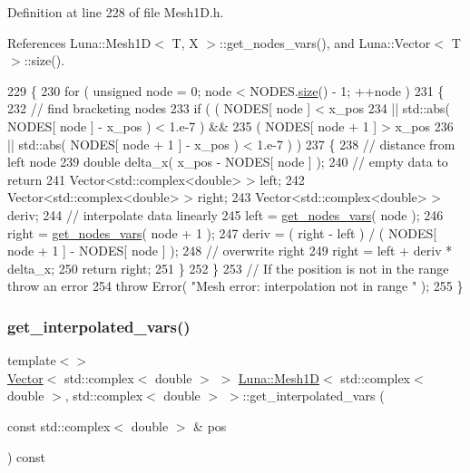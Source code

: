 Definition at line 228 of file Mesh1\+D.\+h.



References Luna\+::\+Mesh1\+D$<$ T, X $>$\+::get\+\_\+nodes\+\_\+vars(), and Luna\+::\+Vector$<$ T $>$\+::size().


\begin{DoxyCode}
229   \{
230     \textcolor{keywordflow}{for} ( \textcolor{keywordtype}{unsigned} node = 0; node < NODES.\hyperlink{classLuna_1_1Vector_ac9b6ed7a0df401728f27c193fbc8f4d8}{size}() - 1; ++node )
231     \{
232       \textcolor{comment}{// find bracketing nodes}
233       \textcolor{keywordflow}{if} ( ( NODES[ node ] < x\_pos
234         || std::abs( NODES[ node ] - x\_pos ) < 1.e-7 ) &&
235            ( NODES[ node + 1 ] > x\_pos
236         || std::abs( NODES[ node + 1 ] - x\_pos ) < 1.e-7 ) )
237       \{
238         \textcolor{comment}{// distance from left node}
239         \textcolor{keywordtype}{double} delta\_x( x\_pos - NODES[ node ] );
240         \textcolor{comment}{// empty data to return}
241         Vector<std::complex<double> > left;
242         Vector<std::complex<double> > right;
243         Vector<std::complex<double> > deriv;
244         \textcolor{comment}{// interpolate data linearly}
245         left = \hyperlink{classLuna_1_1Mesh1D_ac26360c5d246da376ebdcaa9fab05e81}{get\_nodes\_vars}( node );
246         right = \hyperlink{classLuna_1_1Mesh1D_ac26360c5d246da376ebdcaa9fab05e81}{get\_nodes\_vars}( node + 1 );
247         deriv = ( right - left ) / ( NODES[ node + 1 ] - NODES[ node ] );
248         \textcolor{comment}{// overwrite right}
249         right = left + deriv * delta\_x;
250         \textcolor{keywordflow}{return} right;
251       \}
252     \}
253     \textcolor{comment}{// If the position is not in the range throw an error}
254     \textcolor{keywordflow}{throw} Error( \textcolor{stringliteral}{"Mesh error: interpolation not in range "} );
255   \}
\end{DoxyCode}
\mbox{\label{classLuna_1_1Mesh1D_a58f5f0a80fc4af9e82d5753f5b29604a}} 
\subsubsection{\texorpdfstring{get\+\_\+interpolated\+\_\+vars()}{get\_interpolated\_vars()}\hspace{0.1cm}{\footnotesize\ttfamily [4/4]}}
{\footnotesize\ttfamily template$<$$>$ \\
\hyperlink{classLuna_1_1Vector}{Vector}$<$ std\+::complex$<$ double $>$ $>$ \hyperlink{classLuna_1_1Mesh1D}{Luna\+::\+Mesh1D}$<$ std\+::complex$<$ double $>$, std\+::complex$<$ double $>$ $>$\+::get\+\_\+interpolated\+\_\+vars (\begin{DoxyParamCaption}\item[{const std\+::complex$<$ double $>$ \&}]{pos }\end{DoxyParamCaption}) const\hspace{0.3cm}{\ttfamily [inline]}}



